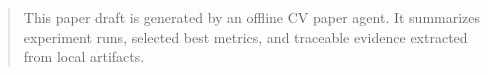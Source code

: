 \begin{abstract}
This paper draft is generated by an offline CV paper agent. It summarizes experiment runs, selected best metrics, and traceable evidence extracted from local artifacts.
\end{abstract}
